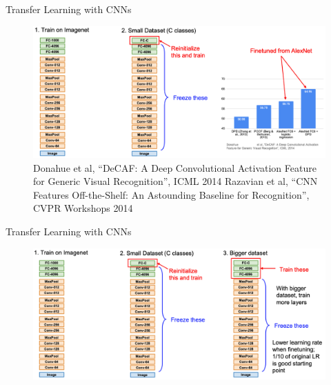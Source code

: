 \documentclass[serif, aspectratio=169]{beamer}
\begin{document}
\begin{frame}{Transfer Learning with CNNs}
	\begin{figure}[htpb]
		\begin{center}
			\includegraphics[keepaspectratio, scale=0.25]{pic/TL_cnn}
			\caption*{\scriptsize Donahue et al, “DeCAF: A Deep Convolutional Activation Feature for Generic Visual Recognition”, ICML 2014 \newline Razavian et al, “CNN Features Off-the-Shelf: An Astounding Baseline for Recognition”, CVPR Workshops 2014}
		\end{center}
	\end{figure}
\end{frame}

\begin{frame}{Transfer Learning with CNNs}
	\begin{figure}[htpb]
		\begin{center}
			\includegraphics[keepaspectratio, scale=0.25]{pic/TL_cnn2}
		\end{center}
	\end{figure}
\end{frame}
\end{document}
